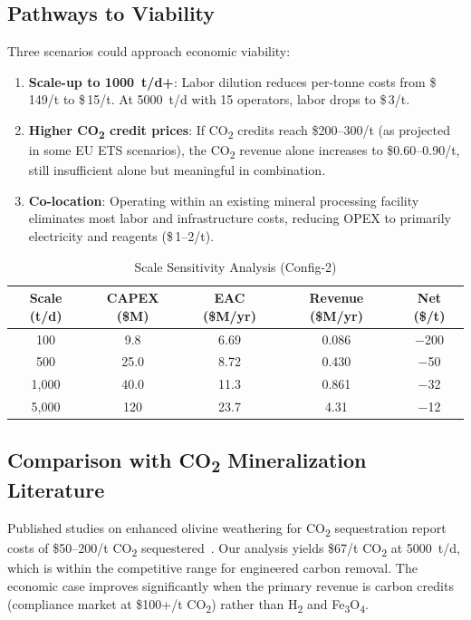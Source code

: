 \documentclass[11pt,a4paper]{article}
\begin{document}
\subsection{Pathways to Viability}

Three scenarios could approach economic viability:

\begin{enumerate}[noitemsep]
  \item \textbf{Scale-up to \SI{1000}{t/d}+}: Labor dilution reduces per-tonne costs from \$\,149/t to \$\,15/t. At \SI{5000}{t/d} with 15 operators, labor drops to \$\,3/t.
  \item \textbf{Higher CO\textsubscript{2} credit prices}: If CO\textsubscript{2} credits reach \$200--300/t (as projected in some EU ETS scenarios), the CO\textsubscript{2} revenue alone increases to \$0.60--0.90/t, still insufficient alone but meaningful in combination.
  \item \textbf{Co-location}: Operating within an existing mineral processing facility eliminates most labor and infrastructure costs, reducing OPEX to primarily electricity and reagents (\$\,1--2/t).
\end{enumerate}

\begin{table}[H]
\centering
\caption{Scale Sensitivity Analysis (Config-2)}
\label{tab:scale}
\begin{tabular}{ccccc}
\toprule
\textbf{Scale (t/d)} & \textbf{CAPEX (\$M)} & \textbf{EAC (\$M/yr)} & \textbf{Revenue (\$M/yr)} & \textbf{Net (\$/t)} \\
\midrule
100   & 9.8  & 6.69 & 0.086 & $-$200 \\
500   & 25.0 & 8.72 & 0.430 & $-$50 \\
1,000 & 40.0 & 11.3 & 0.861 & $-$32 \\
\rowcolor{yellow!20}
5,000 & 120  & 23.7 & 4.31  & $-$12 \\
\bottomrule
\end{tabular}
\end{table}

\subsection{Comparison with CO\textsubscript{2} Mineralization Literature}

Published studies on enhanced olivine weathering for CO\textsubscript{2} sequestration report costs of \$50--200/t CO\textsubscript{2} sequestered~\cite{kelemen2020,pan2020}.
Our analysis yields \$67/t CO\textsubscript{2} at \SI{5000}{t/d}, which is within the competitive range for engineered carbon removal.
The economic case improves significantly when the primary revenue is carbon credits (compliance market at \$100+/t CO\textsubscript{2}) rather than H\textsubscript{2} and Fe\textsubscript{3}O\textsubscript{4}.
\end{document}
